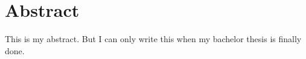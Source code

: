 \chapter*{Abstract}

This is my abstract. But I can only write this when my bachelor thesis is finally done. 
